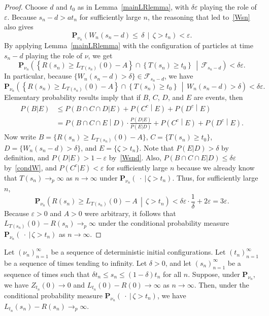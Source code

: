 \documentclass[AHL,Unicode,longabstracts,published]{cedram}
\newcommand*\eps{\varepsilon}
\renewcommand*\P{\mathbf{P}}
\newcommand\F{\mathcal{F}}
\newcommand{\1} {\mathds{1}}
\begin{document}
\begin{proof}
Choose $d$ and $t_0$ as in Lemma~\ref{mainLRlemma}, with $\delta \eps$ playing the role of $\eps$. Because $s_n - d > at_n$ for sufficiently large $n$, the reasoning that led to~\eqref{Wsn} also gives
\begin{equation}\label{Wsnd}
\P_{\nu_n} \left(W_n(s_n - d) \leq \,\delta \,\middle|\, \zeta > t_n\right) < \eps.
\end{equation}
By applying Lemma~\ref{mainLRlemma} with the configuration of particles at time $s_n - d$ playing the role of $\nu$, we get
\[
\P_{\nu_n}\left(\left\{R(s_n) \geq L_{T(s_n)}(0) - A\right\} \cap \left\{T(s_n) \geq t_0\right\}\,\middle|\,\F_{s_n - d}\right) < \delta \eps.
\]
In particular, because $\{W_n(s_n - d) > \delta\} \in \F_{s_n - d}$, we have
\begin{equation}\label{condW}
\P_{\nu_n}\left(\left\{R(s_n) \geq L_{T(s_n)}(0) - A\right\} \cap \left\{T(s_n) \geq t_0\right\}\,\middle|\,W_n(s_n - d) > \delta\right) < \delta \eps.
\end{equation}
Elementary probability results imply that if $B$, $C$, $D$, and $E$ are events, then
\begin{align*}
P(B|E) &\leq P(B \cap C \cap D|E) + P\left(C^c\middle|E\right) + P\left(D^c\middle|E\right) \\
&= P\left(B \cap C \cap E\middle|D\right) \cdot \frac{P(D|E)}{P(E|D)} + P\left(C^c\middle|E\right) + P\left(D^c\middle|E\right).
\end{align*}
Now write $B = \{R(s_n) \geq L_{T(s_n)}(0) - A\}$, $C = \{T(s_n) \geq t_0\}$, $D = \{W_n(s_n - d) > \delta\}$, and $E = \{\zeta > t_n\}$. Note that $P(E|D) > \delta$ by definition, and $P(D|E) > 1 - \eps$ by~\eqref{Wsnd}. Also, $P(B \cap C \cap E|D) \leq \delta \eps$ by~\eqref{condW}, and $P(C^c|E) < \eps$ for sufficiently large $n$ because we already know that $T(s_n) \rightarrow_p \infty$ as $n \rightarrow \infty$ under $\P_{\nu_n}(\: \cdot \: |\, \zeta > t_n)$. Thus, for sufficiently large $n$,
\[
\P_{\nu_n}\left(R(s_n) \geq L_{T(s_n)}(0) - A\,\middle|\, \zeta > t_n\right) < \delta \eps \cdot \frac{1}{\delta} + 2 \eps = 3 \eps.
\]
Because $\eps > 0$ and $A > 0$ were arbitrary, it follows that $L_{T(s_n)}(0) - R(s_n) \rightarrow_p \infty$ under the conditional probability measure $\P_{\nu_n}(\: \cdot \:|\,\zeta > t_n)$ as $n \rightarrow \infty$.
\end{proof}

\begin{lemm}\label{Ttcompare}
Let $(\nu_n)_{n=1}^{\infty}$ be a sequence of deterministic initial configurations. Let $(t_n)_{n=1}^{\infty}$ be a sequence of times tending to infinity. Let $\delta > 0$, and let $(s_n)_{n=1}^{\infty}$ be a sequence of times such that $\delta t_n \leq s_n \leq (1 - \delta) t_n$ for all $n$. Suppose, under $\P_{\nu_n}$, we have $Z_{t_n}(0) \rightarrow 0$ and $L_{t_n}(0) - R(0) \rightarrow \infty$ as $n \rightarrow \infty$. Then, under the conditional probability measure $\P_{\nu_n}(\: \cdot \:|\,\zeta > t_n)$, we have $L_{t_n}(s_n) - R(s_n) \rightarrow_p \infty$.
\end{lemm}
\end{document}
